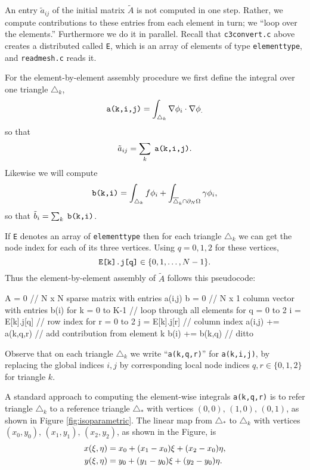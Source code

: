 An entry $\tilde a_{ij}$ of the initial matrix $\tilde A$ is not computed in one step.  Rather, we compute contributions to these entries from each element in turn; we ``loop over the elements.''  Furthermore we do it in parallel.  Recall that \texttt{c3convert.c} above creates a distributed \pVec called \texttt{E}, which is an array of elements of type \texttt{elementtype}, and \texttt{readmesh.c} reads it.

For the element-by-element assembly procedure we first define the integral over one triangle $\triangle_k$,
\begin{equation}
\text{\texttt{a(k,i,j)}} = \int_{\triangle_k} \nabla \phi_i \cdot \nabla \phi_. \label{aelementintegral}
\end{equation}
so that
    $$\tilde a_{ij} = \sum_k \phantom{.}\text{\texttt{a(k,i,j)}}.$$
Likewise we will compute
\begin{equation}
\text{\texttt{b(k,i)}} = \int_{\triangle_k} f \phi_i + \int_{\overline{\triangle}_k \cap \partial_N\Omega} \gamma \phi_i, \label{belementintegral}
\end{equation}
so that $\tilde b_i = \sum_{k} \;\text{\texttt{b(k,i)}}$.

If \texttt{E} denotes an array of \texttt{elementtype} then for each triangle $\triangle_k$ we can get the node index for each of its three vertices.  Using $q=0,1,2$ for these vertices,
    $$\text{\texttt{E[k].j[q]}} \in \{0,1,\dots,N-1\}.$$
Thus the element-by-element assembly of $\tilde A$ follows this pseudocode:
\begin{code}
A = 0                           // N x N sparse matrix with entries a(i,j)
b = 0                           // N x 1 column vector with entries b(i)
for k = 0 to K-1                // loop through all elements
    for q = 0 to 2
        i = E[k].j[q]           // row index
        for r = 0 to 2
            j = E[k].j[r]       // column index
            a(i,j) += a(k,q,r)  // add contribution from element k
            b(i)   += b(k,q)    // ditto
\end{code}
\medskip\noindent
Observe that on each triangle $\triangle_k$ we write ``\texttt{a(k,q,r)}'' for \texttt{a(k,i,j)}, by replacing the global indices $i,j$ by corresponding local node indices $q,r\in\{0,1,2\}$ for triangle $k$.

A standard approach to computing the element-wise integrals \texttt{a(k,q,r)} is to refer triangle $\triangle_k$ to a reference triangle $\triangle_\ast$ with vertices $(0,0),\,(1,0),\,(0,1)$, as shown in Figure \ref{fig:isoparametric}.  The linear map from $\triangle_\ast$ to $\triangle_k$ with vertices $(x_0,y_0),\,(x_1,y_1),\,(x_2,y_2)$, as shown in the Figure, is
\begin{align}
x(\xi,\eta) &= x_0 + (x_1-x_0) \xi + (x_2-x_0) \eta, \label{trianglemap} \\
y(\xi,\eta) &= y_0 + (y_1-y_0) \xi + (y_2-y_0) \eta. \notag
\end{align}

